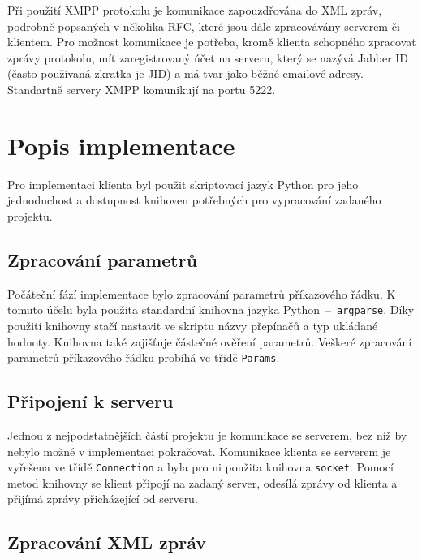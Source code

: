 \documentclass[11pt,a4paper]{article}
\begin{document}
    Při použití XMPP protokolu je komunikace zapouzdřována do XML zpráv,
    podrobně
    popsaných v několika RFC, které jsou dále zpracovávány serverem či
    klientem. Pro možnost komunikace je potřeba, kromě klienta schopného
    zpracovat zprávy protokolu, mít zaregistrovaný účet na serveru, který se
    nazývá Jabber ID (často používaná zkratka je JID) a má tvar jako běžné
    emailové adresy. Standartně servery XMPP komunikují na portu 5222.

  \section{Popis implementace} \label{implementace}

    Pro implementaci klienta byl použit skriptovací jazyk Python pro jeho
    jednoduchost a dostupnost knihoven potřebných pro vypracování zadaného
    projektu.

    \subsection{Zpracování parametrů} \label{parametry}

      Počáteční fází implementace bylo zpracování parametrů příkazového řádku.
      K tomuto účelu byla použita standardní knihovna jazyka
      Python \,--\, \texttt{argparse}. Díky použití knihovny stačí nastavit
      ve skriptu názvy přepínačů a typ ukládané hodnoty. Knihovna také
      zajišťuje částečné ověření parametrů. Veškeré zpracování parametrů
      příkazového řádku probíhá ve třidě \texttt{Params}.

    \subsection{Připojení k serveru} \label{pripojeni}

      Jednou z nejpodstatnějších částí projektu je komunikace se serverem, bez
      níž by nebylo možné v implementaci pokračovat. Komunikace klienta se 
      serverem je vyřešena ve třídě \texttt{Connection} a byla pro ni 
      použita knihovna \texttt{socket}.
      Pomocí metod knihovny se klient připojí na zadaný server, odesílá zprávy
      od klienta a přijímá zprávy přicházející od serveru.

    \subsection{Zpracování XML zpráv} \label{zpracovani-xml}
\end{document}

